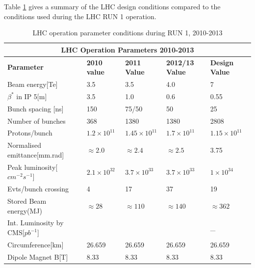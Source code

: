 Table \ref{tab:tableLHC} gives a summary of the LHC design conditions compared to the conditions used during the LHC RUN 1 operation. 
\begin{center}
 \begin{table}[H]
  \begin{turn}{90}
  \centering
  \begin{tabular}{l|l|l|l|l}
  \multicolumn{5}{c}{\bfseries{LHC Operation Parameters 2010-2013}} \\
  \hline
  \toprule
  \bfseries{Parameter} & \bfseries{2010 value} & \bfseries{2011 Value} & \bfseries{2012/13 Value} & \bfseries{Design Value} \\
   \hline \hline
   Beam energy[Te] & 3.5  & 3.5  & 4.0  & 7 \\ 
  \hline
  $\beta^{\ast}$ in IP 5[m] & 3.5 & 1.0 & 0.6  & 0.55 \\
  \hline
   Bunch spacing [ns]& 150 & 75/50 & 50 & 25 \\
  \hline
  Number of bunches & 368 & 1380 & 1380 & 2808 \\
  \hline
  Protons/bunch  & $1.2 \times 10^{11}$ & $1.45 \times 10^{11}$ &  $1.7 \times 10^{11}$& $1.15 \times 10^{11}$ \\
  \hline
  Normalised emittance[mm.rad] & $\approx 2.0$ & $\approx 2.4$ & $\approx 2.5$ &  3.75\\
  \hline
  Peak luminosity[$cm^{-2}s^{-1}$]& $2.1 \times 10^{32}$ & $3.7 \times 10^{33}$ & $3.7 \times 10^{33}$ & $1 \times 10^{34}$ \\
  \hline
  Evts/bunch crossing & 4 & 17 & 37 &  19 \\
  \hline
  Stored Beam energy(MJ)& $\approx 28$ &  $\approx 110$  & $\approx 140$  & $\approx 362$ \\
  \hline
  Int. Luminosity by CMS[$pb^{-1}$]&  &  &  &  \_ \\
 \hline
 Circumference[km]  &26.659 & 26.659 & 26.659 & 26.659 \\
 \hline
 Dipole Magnet B[T] & 8.33 & 8.33 & 8.33 & 8.33 \\
 \hline  
  \bottomrule
  \end{tabular}
   \caption{LHC operation parameter conditions during RUN 1, 2010-2013}
   \label{tab:tableLHC}
   \end{turn}
  \end{table}
\end{center}


